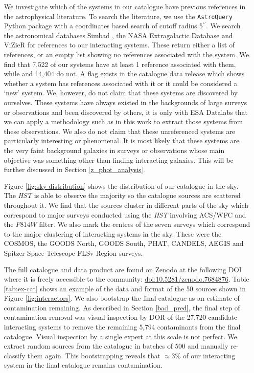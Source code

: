 {We investigate which of the systems in our catalogue have previous references in the astrophysical literature. To search the literature, we use the \texttt{AstroQuery} Python package with a coordinates based search of cutoff radius 5$^{\prime\prime}$. We search the astronomical databases Simbad \citep{simbad}, the NASA Extragalactic Database \citep[NED;][]{1991ASSL..171...89H} and ViZieR \citep{2000A&AS..143...23O} for references to our interacting systems. These return either a list of references, or an empty list showing no references associated with the system. We find that 7,522 of our systems have at least 1 reference associated with them, while and 14,404 do not. A flag exists in the catalogue data release which shows whether a system has references associated with it or it could be considered a `new' system. We, however, do not claim that these systems are discovered by ourselves. These systems have always existed in the backgrounds of large surveys or observations and been discovered by others, it is only with ESA Datalabs that we can apply a methodology such as in this work to extract those systems from these observations. We also do not claim that these unreferenced systems are particularly interesting or phenomenal. It is most likely that these systems are the very faint background galaxies in surveys or observations whose main objective was something other than finding interacting galaxies. This will be further discussed in Section \ref{z_phot_analysis}.

Figure \ref{fig:sky-distribution} shows the distribution of our catalogue in the sky. The \emph{HST} is able to observe the majority so the catalogue sources are scattered throughout it. We find that the sources cluster in different parts of the sky which correspond to major surveys conducted using the \emph{HST} involving ACS/WFC and the $F814W$ filter. We also mark the centres of the seven surveys which correspond to the major clustering of interacting systems in the sky. These were the COSMOS, the GOODS North, GOODS South, PHAT, CANDELS, AEGIS and Spitzer Space Telescope FLSv Region \citep{2004A&A...424..371M} surveys.

The full catalogue and data product are found on Zenodo at the following DOI where it is freely accessible to the community: \href{https://doi.org/10.5281/zenodo.7684876}{doi:10.5281/zenodo.7684876}. Table \ref{tab:ex-cat} shows an example of the data and format of the 50 sources shown in Figure \ref{fig:interactors}. We also bootstrap the final catalogue as an estimate of contamination remaining. As described in Section \ref{bad_pred}, the final step of contamination removal was visual inspection by DOR of the 27,720 candidate interacting systems to remove the remaining 5,794 contaminants from the final catalogue. Visual inspection by a single expert at this scale is not perfect. We extract random sources from the catalogue in batches of 500 and manually re-classify them again. This bootstrapping reveals that $\approx$3\% of our interacting system in the final catalogue remains contamination.

}
